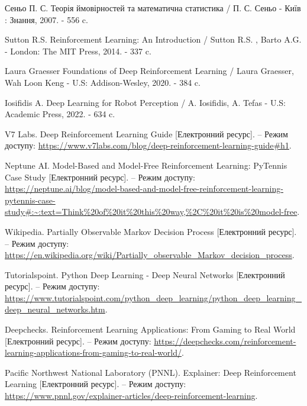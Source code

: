 
 \renewcommand{\bibname}{{Список використаних джерел}}
 \begin{thebibliography}{}
 \setcounter{theorem}{0}

  Сеньо П. С. Теорія ймовірностей та математична статистика / П. С. Сеньо - Київ : Знання, 2007. - 556 c.

  Sutton R.S. Reinforcement Learning: An Introduction / Sutton R.S. , Barto A.G. - London: The MIT Press,
  2014. - 337 c.

  Laura Graesser Foundations of Deep Reinforcement Learning /  Laura Graesser, Wah Loon Keng - U.S: Addison-Wesley, 2020. - 384 c.
   
  Iosifidis A. Deep Learning for Robot Perception /  A. Iosifidis, A. Tefas - U.S: Academic Press, 2022. - 634 c.
    
    V7 Labs. Deep Reinforcement Learning Guide [Електронний ресурс]. – Режим доступу: \url{https://www.v7labs.com/blog/deep-reinforcement-learning-guide\#h1}.

    Neptune AI. Model-Based and Model-Free Reinforcement Learning: PyTennis Case Study [Електронний ресурс]. – Режим доступу: \url{https://neptune.ai/blog/model-based-and-model-free-reinforcement-learning-pytennis-case-study\#:~:text=Think\%20of\%20it\%20this\%20way,\%2C\%20it\%20is\%20model-free}.

    Wikipedia. Partially Observable Markov Decision Process [Електронний ресурс]. – Режим доступу: \url{https://en.wikipedia.org/wiki/Partially_observable_Markov_decision_process}.

    Tutorialspoint. Python Deep Learning - Deep Neural Networks [Електронний ресурс]. – Режим доступу: \url{https://www.tutorialspoint.com/python_deep_learning/python_deep_learning_deep_neural_networks.htm}.

    Deepchecks. Reinforcement Learning Applications: From Gaming to Real World [Електронний ресурс]. – Режим доступу: \url{https://deepchecks.com/reinforcement-learning-applications-from-gaming-to-real-world/}.

    Pacific Northwest National Laboratory (PNNL). Explainer: Deep Reinforcement Learning [Електронний ресурс]. – Режим доступу: \url{https://www.pnnl.gov/explainer-articles/deep-reinforcement-learning}.


\end{thebibliography}
